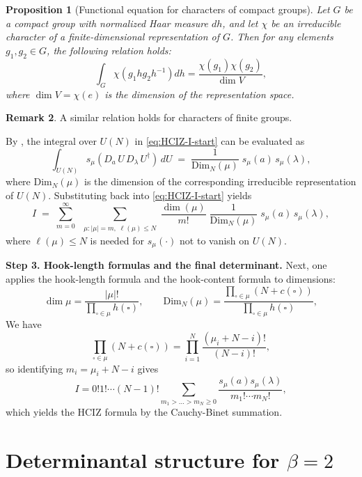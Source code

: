 \documentclass[letterpaper,11pt,oneside,reqno]{article}
\numberwithin{equation}{section}
\newtheorem{proposition}{Proposition}[section]
\theoremstyle{definition}
\newtheorem{remark}[proposition]{Remark}
\begin{document}
\begin{proposition}[Functional equation for characters
	of compact groups]
	\label{prop:character-functional}
Let $G$ be a compact group with normalized Haar measure $dh$, and let $\chi$ be an irreducible character of a finite-dimensional representation of $G$. Then for any elements $g_1, g_2 \in G$, the following relation holds:
\begin{equation}
	\int_G \chi(g_1hg_2h^{-1})dh = \frac{\chi(g_1)\chi(g_2)}{\dim V},
\end{equation}
where $\dim V = \chi(e)$ is the dimension of the representation space.
\end{proposition}
\begin{remark}
	A similar relation holds for characters of finite groups.
\end{remark}
By , the integral over $U(N)$ in \eqref{eq:HCIZ-I-start} can be evaluated as
\[
\int_{U(N)} s_\mu(D_a\,U\,D_\lambda\,U^\dagger)\,dU
\;=\;
\frac{1}{\mathrm{Dim}_N(\mu)}
\;s_\mu(a)\,s_\mu(\lambda),
\]
where
\(\mathrm{Dim}_N(\mu)\) is the dimension of the corresponding irreducible representation of $U(N)$.  Substituting back into \eqref{eq:HCIZ-I-start} yields
\[
I \;=\;
\sum_{m=0}^\infty\;
\sum_{\substack{\mu:|\mu|=m,\;\ell(\mu)\le N}}
\frac{\dim(\mu)}{m!}
\;\frac{1}{\mathrm{Dim}_N(\mu)}
\;s_\mu(a)\,s_\mu(\lambda),
\]
where \(\ell(\mu)\le N\) is needed for $s_\mu(\cdot)$ not to vanish on $U(N)$.

\smallskip

\noindent
\textbf{Step 3. Hook-length formulas and the final determinant.}
Next, one applies the hook-length formula
and the hook-content formula to dimensions:
\begin{equation*}
	\dim \mu=\frac{|\mu|!}{\prod_{\square\in\mu} h(\square)},
	\qquad
	\mathrm{Dim}_N(\mu)=\frac{\prod_{\square\in \mu}(N+c(\square))}{\prod_{\square\in\mu} h(\square)},
\end{equation*}
We have
\begin{equation*}
	\prod_{\square\in \mu}(N+c(\square))=\prod_{i=1}^{N}\frac{(\mu_i+N-i)!}{(N-i)!},
\end{equation*}
so identifying $m_i=\mu_i+N-i$ gives
\begin{equation*}
	I=0! 1! \cdots (N-1)!
	\sum_{m_1>\ldots>m_N\ge0 }\frac{s_\mu(a)s_\mu(\lambda)}{m_1!\cdots m_N!},
\end{equation*}
which yields the HCIZ formula by the Cauchy-Binet summation.

\section{Determinantal structure for $\beta=2$}
\end{document}
